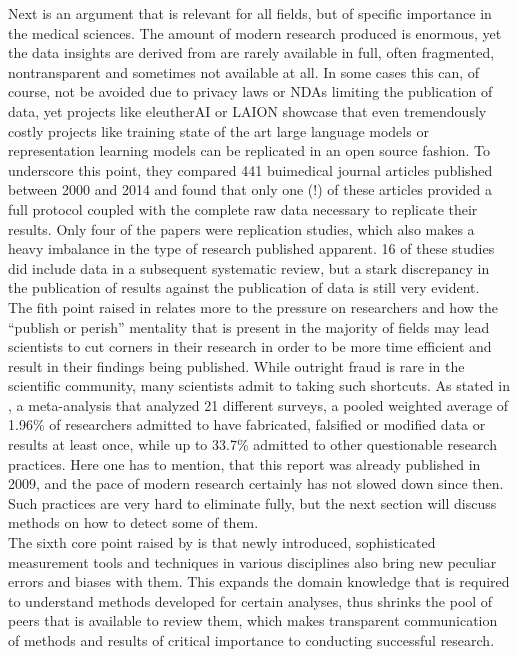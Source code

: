 \documentclass{article}
\begin{document}
Next is an argument that is relevant for all fields, but of specific importance in the medical sciences. The amount of modern research produced is enormous, yet the data insights are derived from are rarely available in full, often fragmented, nontransparent and sometimes not available at all. In some cases this can, of course, not be avoided due to privacy laws or NDAs limiting the publication of data, yet projects like eleutherAI \cite{eleutherai} or LAION \cite{laion} showcase that even tremendously costly projects like training state of the art large language models or representation learning models can be replicated in an open source fashion. To underscore this point, they compared 441 buimedical journal articles published between 2000 and 2014 and found that only one (!) of these articles provided a full protocol coupled with the complete raw data necessary to replicate their results. Only four of the papers were replication studies, which also makes a heavy imbalance in the type of research published apparent. 16 of these studies did include data in a subsequent systematic review, but a stark discrepancy in the publication of results against the publication of data is still very evident.\\
The fith point raised in \cite{metaresearch} relates more to the pressure on researchers and how the ``publish or perish'' mentality that is present in the majority of fields may lead scientists to cut corners in their research in order to be more time efficient and result in their findings being published. While outright fraud is rare in the scientific community, many scientists admit to taking such shortcuts. As stated in \cite{fanelli2009}, a meta-analysis that analyzed 21 different surveys, a pooled weighted average of 1.96\% of researchers admitted to have fabricated, falsified or modified data or results at least once, while up to 33.7\% admitted to other questionable research practices. Here one has to mention, that this report was already published in 2009, and the pace of modern research certainly has not slowed down since then. Such practices are very hard to eliminate fully, but the next section will discuss methods on how to detect some of them. \\
The sixth core point raised by \cite{metaresearch} is that newly introduced, sophisticated measurement tools and techniques in various disciplines also bring new peculiar errors and biases with them. This expands the domain knowledge that is required to understand methods developed for certain analyses, thus shrinks the pool of peers that is available to review them, which makes transparent communication of methods and results of critical importance to conducting successful research. \\
\end{document}
